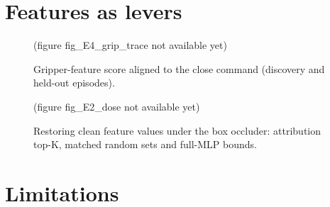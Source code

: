 \documentclass{article}
\begin{document}
\section{Features as levers}
\begin{figure}[t]\centering(figure fig_E4_grip_trace not available yet)
\caption{Gripper-feature score aligned to the close command (discovery and held-out episodes).}\end{figure}


\begin{figure}[t]\centering(figure fig_E2_dose not available yet)
\caption{Restoring clean feature values under the box occluder: attribution top-K, matched random sets and full-MLP bounds.}\end{figure}

\section{Limitations}



\end{document}
